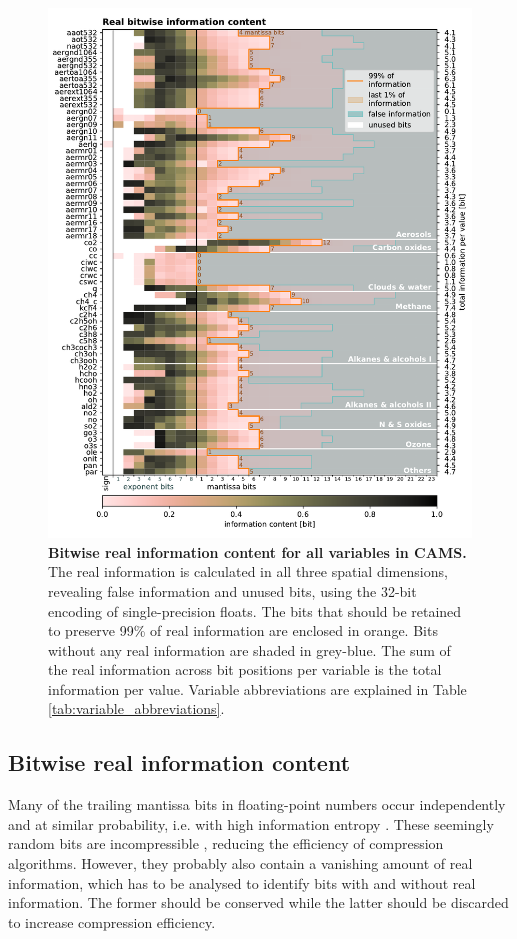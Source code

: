 \begin{figure}[tbhp]
	\includegraphics[width=1\textwidth]{Figures/compression/bitinformation.pdf}
	\caption{\textbf{Bitwise real information content for all variables in CAMS.} 
	The real information is calculated in all three spatial dimensions, revealing false information
	and unused bits, using the 32-bit encoding of single-precision floats. The bits that should be
	retained to preserve 99\% of real information are enclosed in orange. Bits without any real
	information are shaded in grey-blue. The sum of the real information across bit positions
	per variable is the total information per value. Variable abbreviations are explained in Table
	\ref{tab:variable_abbreviations}.}
	\label{fig:bitinformation}
\end{figure}

\subsection{Bitwise real information content}

Many of the trailing mantissa bits in floating-point numbers occur independently and at similar probability,
i.e. with high information entropy \citep{Kleeman2011,Jeffress2017a}. These seemingly random bits are
incompressible \citep{MacKay2003a,Ziv1977,Huffman1952}, reducing
the efficiency of compression algorithms. However, they probably also contain a vanishing amount of real
information, which has to be analysed to identify bits with and without real information. The former should
be conserved while the latter should be discarded to increase compression efficiency.

